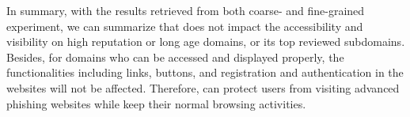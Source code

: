 In summary, with the results retrieved from both coarse- and fine-grained experiment, we can summarize that \spartacus does not impact the accessibility and visibility on high reputation or long age domains, or its top reviewed subdomains.
Besides, for domains who can be accessed and displayed properly, the functionalities including links, buttons, and registration and authentication in the websites will not be affected.
Therefore, \spartacus can protect users from visiting advanced phishing websites while keep their normal browsing activities.





